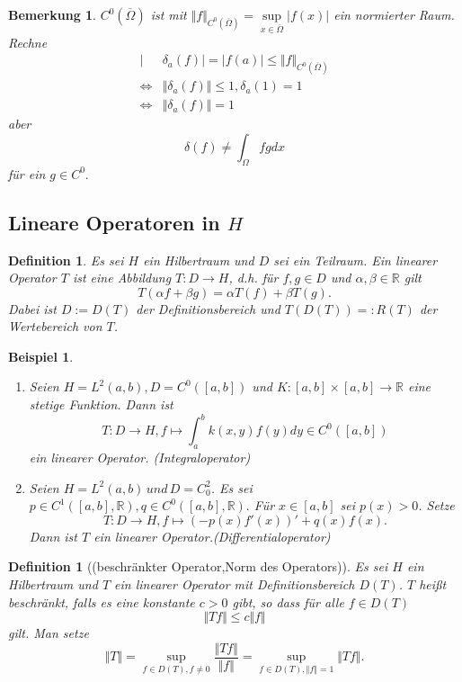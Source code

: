 \documentclass[12pt,titlepage]{article}
\newtheorem{definition}[zahl]{Definition}
\newtheorem{bsp}[zahl]{Beispiel}
\newtheorem{bemerkung}[zahl]{Bemerkung}
\numberwithin{equation}{section}
\begin{document}
\begin{bemerkung}
$C^0 (\overline{\Omega})$ ist mit $\Vert f\Vert_{C^0 (\overline{\Omega})}= \underset{x\in \overline{\Omega}}{\sup}\vert f(x)\vert$ ein normierter Raum.\\
Rechne 
\begin{align*}
\vert & \delta_a (f) \vert = \vert f(a) \vert \leq \Vert f\Vert_{C^0 (\overline{\Omega})}\\
\Leftrightarrow &\Vert \delta_a(f)\Vert \leq 1 , \delta_a(1)=1\\
\Leftrightarrow &\Vert \delta_a(f)\Vert = 1
\end{align*}
aber 
\[
\delta(f) \neq \int_{\Omega} fg dx
\]
für ein $g \in C^0.$
\end{bemerkung}
\subsection{Lineare Operatoren in $H$}
\begin{definition}
Es sei $H$ ein Hilbertraum und $D$ sei ein Teilraum. Ein linearer Operator $T$ ist eine Abbildung $T:D\to H$, d.h. für $f,g \in D$ und $\alpha, \beta\in \mathbb{R}$ gilt
\[
T(\alpha f+\beta g )=\alpha T(f)+\beta T(g).
\]
Dabei ist $D:=D(T)$ der Definitionsbereich und $T(D(T))=:R(T) $ der Wertebereich von $T$.
\end{definition}
\begin{bsp}
\begin{enumerate}
\item Seien $H=L^2(a,b),D=C^0([a,b])$ und $K:[a,b]\times [a,b]\to \mathbb{R}$ eine stetige Funktion. Dann ist 
\[
T:D\to H,f \mapsto \int_a^b k(x,y)f(y)dy \in C^0([a,b])
\] ein linearer Operator. (Integraloperator)
\item Seien $H=L^2(a,b)\, und  \, D=C^2_0$. Es sei $p \in C^1([a,b],\mathbb{R}), q \in C^0([a,b],\mathbb{R}).$ Für $x \in [a,b]$ sei $p(x)>0$. Setze
\[
T:D\to H, f \mapsto (-p(x)f'(x))'+q(x)f(x).
\]Dann ist $T$ ein linearer Operator.(Differentialoperator)
\end{enumerate}
\end{bsp}
\begin{definition}[(beschränkter Operator,Norm des Operators)]
Es sei $H$ ein Hilbertraum und $T$ ein linearer Operator mit Definitionsbereich $D(T)$. $T$ heißt beschränkt, falls es eine konstante $c>0$ gibt, so dass für alle $f \in D(T)$
\[
\Vert Tf\Vert \leq c\Vert f\Vert 
\] gilt.
Man setze 
\[
\Vert T\Vert = \underset{f\in D(T),f\neq 0}{\sup}\frac{\Vert Tf\Vert }{\Vert f \Vert }=\underset{f \in D(T),\Vert f \Vert =1}{\sup}\Vert Tf\Vert.
\] 
\end{definition}
\end{document}
